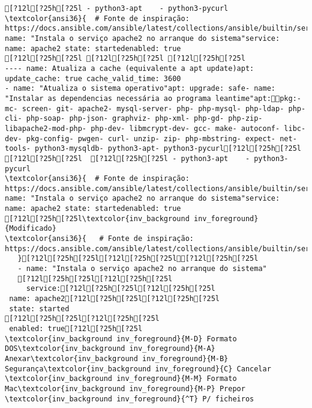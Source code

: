 \documentclass{scrartcl}
\begin{document}
\begin{Verbatim}
[?12l[?25h[?25l - python3-apt    - python3-pycurl
\textcolor{ansi36}{  # Fonte de inspiração: https://docs.ansible.com/ansible/latest/collections/ansible/builtin/service_module.html}- name: "Instala o serviço apache2 no arranque do sistema"service:   name: apache2 state: startedenabled: true
[?12l[?25h[?25l [?12l[?25h[?25l [?12l[?25h[?25l
---- name: Atualiza a cache (equivalente a apt update)apt: update_cache: true cache_valid_time: 3600
- name: "Atualiza o sistema operativo"apt: upgrade: safe- name: "Instalar as dependencias necessária ao programa leantime"apt:pkg:- mc- screen- git- apache2- mysql-server- php- php-mysql- php-ldap- php-cli- php-soap- php-json- graphviz- php-xml- php-gd- php-zip- libapache2-mod-php- php-dev- libmcrypt-dev- gcc- make- autoconf- libc-dev- pkg-config- pwgen- curl- unzip- zip- php-mbstring- expect- net-tools- python3-mysqldb- python3-apt- python3-pycurl[?12l[?25h[?25l
[?12l[?25h[?25l  [?12l[?25h[?25l - python3-apt    - python3-pycurl
\textcolor{ansi36}{  # Fonte de inspiração: https://docs.ansible.com/ansible/latest/collections/ansible/builtin/service_module.html}- name: "Instala o serviço apache2 no arranque do sistema"service:   name: apache2 state: startedenabled: true
[?12l[?25h[?25l\textcolor{inv_background inv_foreground}{Modificado}
\textcolor{ansi36}{   # Fonte de inspiração: https://docs.ansible.com/ansible/latest/collections/ansible/builtin/service_module.html
   }[?12l[?25h[?25l[?12l[?25h[?25l[?12l[?25h[?25l
   - name: "Instala o serviço apache2 no arranque do sistema"
   [?12l[?25h[?25l[?12l[?25h[?25l
     service:[?12l[?25h[?25l[?12l[?25h[?25l
 name: apache2[?12l[?25h[?25l[?12l[?25h[?25l
 state: started
[?12l[?25h[?25l[?12l[?25h[?25l
 enabled: true[?12l[?25h[?25l                      \textcolor{inv_background inv_foreground}{M-D} Formato DOS\textcolor{inv_background inv_foreground}{M-A} Anexar\textcolor{inv_background inv_foreground}{M-B} Segurança\textcolor{inv_background inv_foreground}{C} Cancelar                        \textcolor{inv_background inv_foreground}{M-M} Formato Mac\textcolor{inv_background inv_foreground}{M-P} Prepor         \textcolor{inv_background inv_foreground}{^T} P/ ficheiros

\end{Verbatim}
\end{document}
